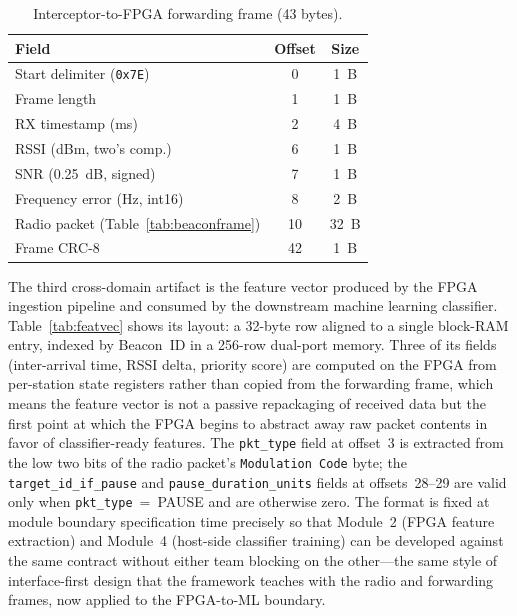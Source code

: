 \documentclass[conference]{IEEEtran}
\begin{document}
\begin{table}[t]
\centering
\caption{Interceptor-to-FPGA forwarding frame (43 bytes).}
\label{tab:rxframe}
\begin{tabular}{l c c}
\toprule
\textbf{Field} & \textbf{Offset} & \textbf{Size} \\
\midrule
Start delimiter (\texttt{0x7E}) & 0  & 1~B \\
Frame length                    & 1  & 1~B \\
RX timestamp (ms)               & 2  & 4~B \\
RSSI (dBm, two's comp.)         & 6  & 1~B \\
SNR (0.25~dB, signed)           & 7  & 1~B \\
Frequency error (Hz, int16)     & 8  & 2~B \\
Radio packet (Table~\ref{tab:beaconframe}) & 10 & 32~B \\
Frame CRC-8                     & 42 & 1~B \\
\bottomrule
\end{tabular}
\end{table}

The third cross-domain artifact is the feature vector produced by the FPGA ingestion pipeline and consumed by the downstream machine learning classifier. Table~\ref{tab:featvec} shows its layout: a 32-byte row aligned to a single block-RAM entry, indexed by Beacon~ID in a 256-row dual-port memory. Three of its fields (inter-arrival time, RSSI delta, priority score) are computed on the FPGA from per-station state registers rather than copied from the forwarding frame, which means the feature vector is not a passive repackaging of received data but the first point at which the FPGA begins to abstract away raw packet contents in favor of classifier-ready features. The \texttt{pkt\_type} field at offset~3 is extracted from the low two bits of the radio packet's \texttt{Modulation Code} byte; the \texttt{target\_id\_if\_pause} and \texttt{pause\_duration\_units} fields at offsets~28--29 are valid only when \texttt{pkt\_type}~=~PAUSE and are otherwise zero. The format is fixed at module boundary specification time precisely so that Module~2 (FPGA feature extraction) and Module~4 (host-side classifier training) can be developed against the same contract without either team blocking on the other---the same style of interface-first design that the framework teaches with the radio and forwarding frames, now applied to the FPGA-to-ML boundary.
\end{document}

